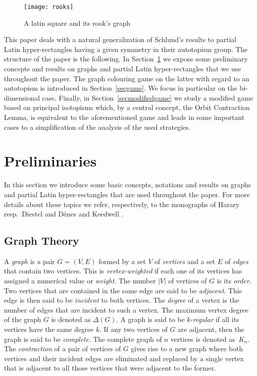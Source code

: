 \documentclass{article}
\begin{document}
\begin{figure}[htbp]
\begin{center}
\texttt{[image: rooks]}
\end{center}
\caption{\label{bildrooks}A latin square and its rook's graph}
\end{figure}

This paper deals with a natural generalization of Schlund's results to partial Latin hyper-rectangles having a given symmetry in their autotopism group. The structure of the paper is 
the following. In Section~\ref{secprelim} we expose some preliminary concepts and results on graphs and partial Latin hyper-rectangles that we use throughout the paper. The graph colouring game on the latter with regard to an autotopism is introduced in Section~\ref{secgame}. We focus in particular on the bi-dimensional case. Finally, in Section~\ref{secmodifiedgame} we study a modified game based on principal isotopisms which, by a central concept, the Orbit Contraction Lemma, is equivalent to the aforementioned game and leads in some important cases to a simplification of the analysis of the used strategies.

\section{Preliminaries}\label{secprelim}

In  this section we introduce some basic concepts, notations and results on graphs and partial Latin hyper-rectangles that are used throughout the paper. For more details about these topics we refer, respectively, to the 
monographs of Harary~\cite{Harary1969} resp.\ Diestel \cite{diestel} and D\'enes and Keedwell \cite{Denes1991}.

\pagebreak[3]

\subsection{Graph Theory}

 A {\em graph} is a pair $G=(V,E)$ formed by a set $V$ of {\em vertices} and a set $E$ of {\em edges} that contain two vertices. This is {\em vertex-weighted} if each one of its 
vertices has assigned a numerical value or 
{\em weight}. 
 The number $|V|$ of vertices of $G$ is its {\em order}. Two vertices that are contained in the same edge are said to be {\em adjacent}. This edge is then said to be {\em incident} to both vertices. The {\em degree} of a 
 vertex is the number of edges that are incident to such a vertex. The maximum vertex degree of the graph $G$ is denoted as $\Delta(G)$. A graph is said to be $k$-{\em regular} if all its vertices have the same degree 
$k$.  If any two vertices of $G$ are adjacent, then the graph is said to be {\em complete}. The complete graph of $n$ vertices is denoted as~$K_n$. The {\em contraction} of a pair of vertices of $G$ gives rise to a new 
graph  where both vertices and their incident edges are eliminated and replaced by a single vertex that is adjacent to all those vertices that were adjacent to the former.
\end{document}

